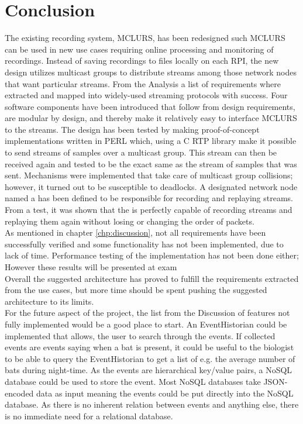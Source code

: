 \chapter{Conclusion}
The existing recording system, MCLURS, has been redesigned such MCLURS can be used in new use cases requiring online processing and monitoring of recordings. Instead of saving recordings to files locally on each RPI, the new design utilizes multicast groups to distribute streams among those network nodes that want particular streams. From the Analysis a list of requirements where extracted and mapped into widely-used streaming protocols with success. Four software components have been introduced that follow from design requirements, are modular by design, and thereby make it relatively easy to interface MCLURS to the streams. The design has been tested by making proof-of-concept implementations written in PERL which, using a C RTP library make it possible to send streams of samples over a multicast group. This stream can then be received again and tested to be the exact same as the stream of samples that was sent. Mechanisms were implemented that take care of multicast group collisions; however, it turned out to be susceptible to deadlocks. A designated network node named a \hist{} has been defined to be responsible for recording and replaying streams. From a test, it was shown that the \hist{} is perfectly capable of recording streams and replaying them again without losing or changing the order of packets. \\

\noindent{}As mentioned in chapter \ref{chp:discussion}, not all requirements have been successfully verified and some functionality has not been implemented, due to lack of time. Performance testing of the implementation has not been done either; However these results will be presented at exam\\

\noindent{} Overall the suggested architecture has proved to fulfill the requirements extracted from the use cases, but more time should be spent pushing the suggested architecture to its limits.\\

\noindent{}For the future aspect of the project, the list from the Discussion of features not fully implemented would be a good place to start. An EventHistorian could be implemented that allows, the user to search through the events. If collected events are events saying when a bat is present, it could be useful to the biologist to be able to query the EventHistorian to get a list of e.g. the average number of bats during night-time. As the events are hierarchical key/value pairs, a NoSQL database could be used to store the event. Most NoSQL databases take JSON-encoded data as input meaning the events could be put directly into the NoSQL database. As  there is no inherent relation between events and anything else, there is no immediate need for a relational database.

